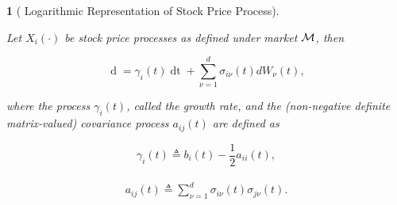 \documentclass[british]{amsart} \usepackage{lmodern}
\numberwithin{equation}{section} \numberwithin{figure}{section}
\theoremstyle{plain} \newtheorem{thm}{\protect\theoremname}[section]
\theoremstyle{definition} \newtheorem{defn}[thm]{\protect\definitionname}
\theoremstyle{plain} \newtheorem{assumption}[thm]{\protect\assumptionname}
\theoremstyle{plain} \newtheorem{lem}[thm]{\protect\lemmaname}
\theoremstyle{plain} \newtheorem{prop}[thm]{\protect\propositionname}
\theoremstyle{remark} \newtheorem{rem}[thm]{\protect\remarkname}
\theoremstyle{plain} \newtheorem{cor}[thm]{\protect\corollaryname}
\renewcommand{\d}[1]{\mathop{\mathrm{d}{#1}}}
\newcommand{\defeq}{\mathop{\triangleq}} \newcommand{\almostsurely}{\text{a.s.}}
\begin{document}
\begin{prop} [
  {\cite[Equation 1.5]{fernholz2009}} 
  Logarithmic Representation of Stock Price Process]
  \label{thm:logarithmicrepresentation}

  Let $X_{i}(\cdot)$ be stock price processes as defined under market $\mathcal{M}$,
  then

  \begin{equation}
    \label{eq:dlogX}
        \d{\log{X_{i}(t)}} =
          \gamma_{i}(t) \d{t} +
          \sum_{\nu=1}^{d} \sigma_{i\nu}(t) dW_{\nu}(t),
  \end{equation}

  where the process $\gamma_{i}(t)$, called the \textit{growth rate}, and the
  (non-negative definite matrix-valued) \textit{covariance process} $a_{ij}(t)$
  are defined as

  \begin{equation}
    \label{eq:gamma}
    \gamma_{i}(t)\defeq b_{i}(t) - \frac{1}{2}a_{ii}(t),
  \end{equation}

  \begin{gather}
    \label{eq:covarianceprocess}
    \begin{split}
      a_{ij}(t)
         \defeq \sum_{\nu=1}^{d}\sigma_{i\nu}(t)\sigma_{j\nu}(t).
    \end{split}
  \end{gather}

\end{prop}
\end{document}
